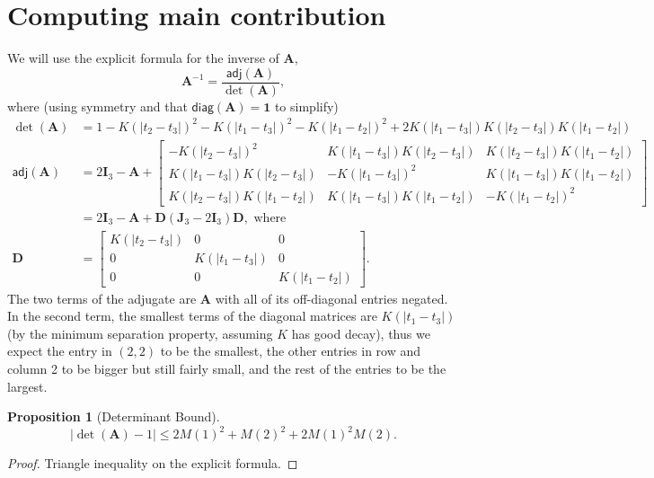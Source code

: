 \documentclass[11pt]{article}
\newcommand{\one}{\bm{1}}
\newcommand{\adj}{\mathsf{adj}}
\newcommand{\diag}{\mathsf{diag}}
\newcommand{\bA}{\bm A}
\newcommand{\bD}{\bm D}
\newtheorem{proposition}{Proposition}
\begin{document}
\section{Computing main contribution}

We will use the explicit formula for the inverse of $\bA$,
\[ \bA^{-1} = \frac{\adj(\bA)}{\det(\bA)}, \]
where (using symmetry and that $\diag(\bA) = \one$ to simplify)
\begin{align*}
  \det(\bA) &= 1 - K(|t_2 - t_3|)^2 - K(|t_1 - t_3|)^2 - K(|t_1 - t_2|)^2 + 2K(|t_1 - t_3|)K(|t_2 - t_3|)K(|t_1 - t_2|) \\
  \adj(\bA) &= 2 \bm I_3 - \bA + \left[
              \begin{array}{ccc}
                - K(|t_2 - t_3|)^2 & K(|t_1 - t_3|)K(|t_2 - t_3|) &  K(|t_2 - t_3|)K(|t_1 - t_2|) \\
                                   K(|t_1 - t_3|)K(|t_2 - t_3|) & -K(|t_1 - t_3|)^2 & K(|t_1 - t_3|)K(|t_1 - t_2|) \\
                                   K(|t_2 - t_3|)K(|t_1 - t_2|) & K(|t_1 - t_3|)K(|t_1 - t_2|) & -K(|t_1 - t_2|)^2
              \end{array}\right] \\
            &= 2 \bm I_3 - \bA + \bD(\bm J_3 - 2\bm I_3)\bD, \text{ where} \\
  \bD &= \left[
              \begin{array}{ccc}
                K(|t_2 - t_3|) & 0 & 0 \\
                0 & K(|t_1 - t_3|) & 0 \\
                0 & 0 & K(|t_1 - t_2|)
              \end{array}\right].
\end{align*}
The two terms of the adjugate are $\bA$ with all of its off-diagonal entries negated.
In the second term, the smallest terms of the diagonal matrices are $K(|t_1 - t_3|)$ (by the minimum separation property, assuming $K$ has good decay), thus we expect the entry in $(2, 2)$ to be the smallest, the other entries in row and column 2 to be bigger but still fairly small, and the rest of the entries to be the largest.

\begin{proposition}[Determinant Bound]
    \[ |\det(\bA) - 1| \leq 2M(1)^2 + M(2)^2 + 2M(1)^2M(2). \]
\end{proposition}
\begin{proof}
    Triangle inequality on the explicit formula.
\end{proof}
\end{document}
